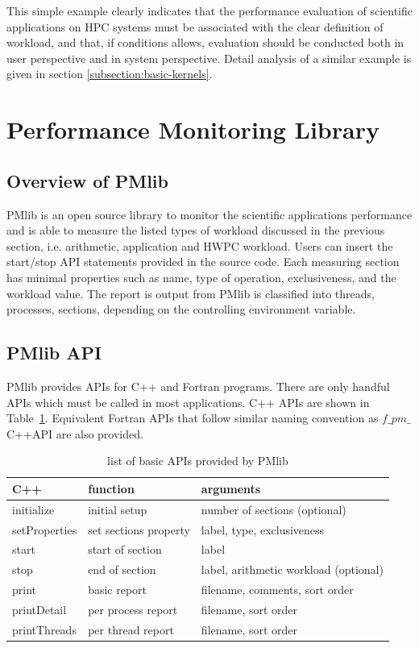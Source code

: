 \documentclass[conference]{IEEEtran}
\begin{document}
This simple example clearly indicates that the performance evaluation of
scientific applications on HPC systems must be associated with the clear
definition of workload, and that, if conditions allows, evaluation should be
conducted both in user perspective and in system perspective.
Detail analysis of a similar example is given in section
\ref{subsection:basic-kernels}.

\section{Performance Monitoring Library}
\label{section:PMlib}

%
\subsection {Overview of PMlib}
PMlib is an open source library to monitor the scientific applications
performance and is able to measure the listed types of workload discussed
in the previous
section, i.e. arithmetic, application and HWPC workload.
Users can insert the start/stop API statements provided in the source code.
Each measuring section has minimal properties such as name, type of operation,
exclusiveness, and the workload value.
The report is output from PMlib is classified into threads, processes, sections,
depending on the controlling environment variable.

%
\subsection{PMlib API}
PMlib provides APIs for C++ and Fortran programs.
There are only handful APIs which must be called in most applications.
C++ APIs are shown in Table~\ref{tab:PMlib-API}. 
Equivalent Fortran APIs that follow similar naming convention as
$f\_pm\_${\footnotesize{C++API}} are also provided.

\begin{table}[htb]
\scriptsize
\caption{list of basic APIs provided by PMlib}
\label{tab:PMlib-API}
\footnotesize
\begin{tabular}{l|l|l} \hline
\scriptsize
C++	& function	&	arguments	\\ \hline \hline
initialize	& initial setup	& number of sections (optional)	\\ %
setProperties	& set sections property	& label, type, exclusiveness \\ %
start	& start of section	& label \\ %
stop	& end of section	& label, arithmetic workload (optional)	\\ %
print	& basic report	& filename, comments, sort order	\\ %
printDetail	& per process report	& filename, sort order	\\ %
printThreads	& per thread report	& filename, sort order	\\ \hline
\end{tabular}
\end{table}
\end{document}
